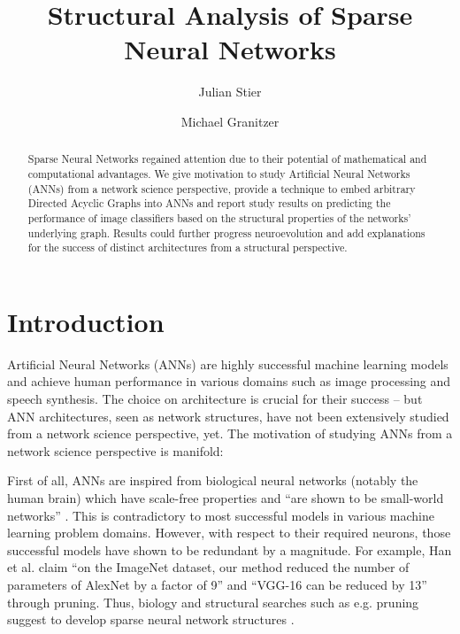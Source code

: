 \documentclass[runningheads]{llncs}
\begin{document}
\title{Structural Analysis of Sparse Neural Networks}
\author{Julian Stier \and Michael Granitzer}

\maketitle


\begin{abstract}
Sparse Neural Networks regained attention due to their potential of mathematical and computational advantages.
We give motivation to study Artificial Neural Networks (ANNs) from a network science perspective, provide a technique to embed arbitrary Directed Acyclic Graphs into ANNs and report study results on predicting the performance of image classifiers based on the structural properties of the networks' underlying graph.
Results could further progress neuroevolution and add explanations for the success of distinct architectures from a structural perspective.
\end{abstract}




\section{Introduction}\label{sec:introduction}
Artificial Neural Networks (ANNs) are highly successful machine learning models and achieve human performance in various domains such as image processing and speech synthesis.
The choice on architecture is crucial for their success -- but ANN architectures, seen as network structures, have not been extensively studied from a network science perspective, yet.
The motivation of studying ANNs from a network science perspective is manifold:

First of all, ANNs are inspired from biological neural networks (notably the human brain) which have scale-free properties and ``are shown to be small-world networks'' \cite{watts1998collective}.
This is contradictory to most successful models in various machine learning problem domains.
However, with respect to their required neurons, those successful models have shown to be redundant by a magnitude.
For example, Han et al. claim ``on the ImageNet dataset, our method reduced the number of parameters of AlexNet by a factor of 9'' and ``VGG-16 can be reduced by 13'' \cite{han2015learning} through pruning.
Thus, biology and structural searches such as e.g. pruning suggest to develop sparse neural network structures \cite{stier2018analysing}.
\end{document}
